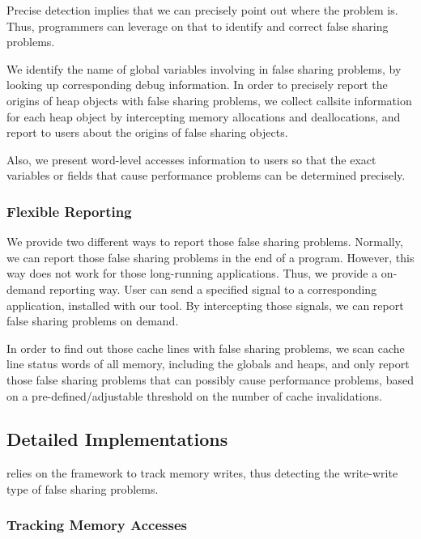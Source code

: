 Precise detection implies that we can precisely point out where the problem is. Thus, programmers can leverage on that to identify and correct false sharing problems.

We identify the name of global variables involving in false sharing problems, by looking up corresponding debug information. In order to precisely report the origins of heap objects with false sharing problems, we collect callsite information for each heap object by intercepting memory allocations and deallocations, and report to users about the origins of false sharing objects.

Also, we present word-level accesses information to users so that the exact variables or fields that cause performance problems can be determined precisely.

\subsubsection{Flexible Reporting}
\label{sec:flexiblereport}

We provide two different ways to report those false sharing problems. Normally, we can report those false sharing problems in the end of a program. However, this way does not work for those long-running applications. Thus, we provide a on-demand reporting way. User can send a specified signal to a corresponding application, installed with our tool. By intercepting those signals, we can report false sharing problems on demand.

In order to find out those cache lines with false sharing problems, we scan cache line status words of all memory, including the globals and heaps, and only report those false sharing problems that can possibly cause performance problems, based on a pre-defined/adjustable threshold on the number of cache invalidations.

\subsection{Detailed Implementations}

\label{sec:sheriffdetect}
\SheriffDetect{} relies on the \sheriff{} framework to track memory writes, thus detecting the write-write type of false sharing problems.  

\subsubsection{Tracking Memory Accesses}
\label{sec:memoryaccesses}

